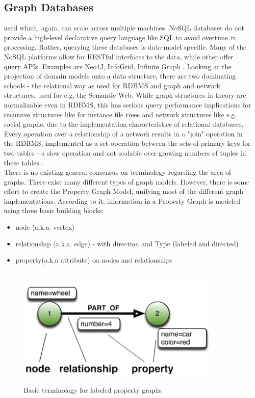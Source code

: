 \subsection{Graph Databases}
\hspace*{0.7in} used which, again, can scale across multiple machines. NoSQL databases do not provide a high-level declarative query language like SQL to avoid overtime in processing. Rather, querying these databases is data-model specific. Many of the NoSQL platforms allow for RESTful interfaces to the data, while other offer query APIs. Examples are Neo4J, InfoGrid, Infinite Graph \cite{8}. Looking at the projection of domain models onto a data structure, there are two dominating schools - the relational way as used for RDBMS and graph and network structures, used for e.g. the Semantic Web. While graph structures in theory are normalizable even in RDBMS, this has serious query performance implications for recursive structures like for instance file trees and network structures like e.g. social graphs, due to the implementation characteristics of relational databases. Every operation over a relationship of a network results in a "join" operation in the RDBMS, implemented as a set-operation between the sets of primary keys for two tables - a slow operation and not scalable over growing numbers of tuples in these tables \cite{4}.
\\
\hspace*{0.7in} There is no existing general consensus on terminology regarding the area of graphs. There exist many different types of graph models. However, there is some effort to create the Property Graph Model, unifying most of the different graph implementations. According to it, information in a Property Graph is modeled using three basic building blocks:
\begin{itemize}
  \item node (a.k.a. vertex)
  \item relationship (a.k.a. edge) - with direction and Type (labeled and directed)
  \item property(a.k.a attribute) on nodes and relationships
\end{itemize}

\begin{figure}[h]
\centering
  \includegraphics[width=10cm,height=6cm]{L1.jpg}
  \caption{Basic terminology for labeled property graphs}\label{Basic terminology for labeled property graphs}
\end{figure}

